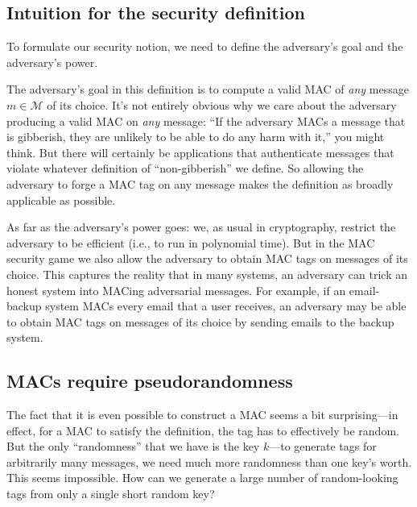 \documentclass[
  letterpaper,
]{scrbook}
\theoremstyle{definition}
\theoremstyle{plain}
\theoremstyle{plain}
\theoremstyle{remark}
\begin{document}
\subsection{Intuition for the security
definition}\label{intuition-for-the-security-definition}

To formulate our security notion, we need to define the adversary's goal
and the adversary's power.

The adversary's goal in this definition is to compute a valid MAC of
\emph{any} message \(m\in \mathcal{M}\) of its choice. It's not entirely
obvious why we care about the adversary producing a valid MAC on
\emph{any} message: ``If the adversary MACs a message that is gibberish,
they are unlikely to be able to do any harm with it,'' you might think.
But there will certainly be applications that authenticate messages that
violate whatever definition of ``non-gibberish'' we define. So allowing
the adversary to forge a MAC tag on any message makes the definition as
broadly applicable as possible.

As far as the adversary's power goes: we, as usual in cryptography,
restrict the adversary to be efficient (i.e., to run in polynomial
time). But in the MAC security game we also allow the adversary to
obtain MAC tags on messages of its choice. This captures the reality
that in many systems, an adversary can trick an honest system into
MACing adversarial messages. For example, if an email-backup system MACs
every email that a user receives, an adversary may be able to obtain MAC
tags on messages of its choice by sending emails to the backup system.


\subsection{MACs require
pseudorandomness}\label{macs-require-pseudorandomness}

The fact that it is even possible to construct a MAC seems a bit
surprising---in effect, for a MAC to satisfy the definition, the tag has
to effectively be random. But the only ``randomness'' that we have is
the key \(k\)---to generate tags for arbitrarily many messages, we need
much more randomness than one key's worth. This seems impossible. How
can we generate a large number of random-looking tags from only a single
short random key?
\end{document}
